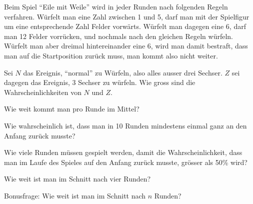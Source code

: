 Beim Spiel ``Eile mit Weile'' wird in jeder Runden nach folgenden Regeln
verfahren.
Würfelt man eine Zahl zwischen 1 und 5, darf man mit der Spielfigur
um eine entsprechende Zahl Felder vorwärts. Würfelt man dagegen
eine 6, darf man 12 Felder vorrücken, und nochmals nach den
gleichen Regeln würfeln. Würfelt man aber dreimal hintereinander
eine 6, wird man damit bestraft, dass man auf die Startposition
zurück muss, man kommt also nicht weiter.
\begin{teilaufgaben}
\item Sei $N$ das Ereignis, ``normal'' zu Würfeln, also alles ausser drei
Sechser. $Z$ sei dagegen das Ereignis, 3 Sechser zu würfeln. Wie gross
sind die Wahrscheinlichkeiten von $N$ und $Z$.
\item Wie weit kommt man pro Runde im Mittel?
\item Wie wahrscheinlich ist, dass man in 10 Runden mindestens einmal
ganz an den Anfang zurück musste?
\item Wie viele Runden müssen gespielt werden, damit die Wahrscheinlichkeit,
dass man im Laufe des Spieles auf den Anfang zurück musste, grösser als 50\%
wird?
\item Wie weit ist man im Schnitt nach vier Runden?
\item Bonusfrage: Wie weit ist man im Schnitt nach $n$ Runden?
\end{teilaufgaben}

